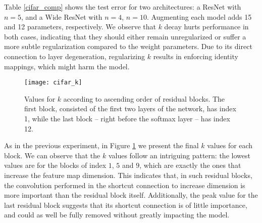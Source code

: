 \documentclass{article} \RequirePackage{amsmath,amsthm,amsfonts,amssymb}
\begin{document}
Table \ref{cifar_comp} shows the test error for two architectures: a ResNet with $n = 5$, and a Wide ResNet with $n = 4$, $n = 10$. Augmenting each model adds 15 and 12 parameters, respectively. We observe that $k$ decay hurts performance in both cases, indicating that they should either remain unregularized or suffer a more subtle regularization compared to the weight parameters. Due to its direct connection to layer degeneration, regularizing $k$ results in enforcing identity mappings, which might harm the model.




\begin{figure}[!ht]
  \centering
    \texttt{[image: cifar\_k]}
  \caption{Values for $k$ according to ascending order of residual blocks. The first block, consisted of the first two layers of the network, has index 1, while the last block -- right before the softmax layer -- has index 12.}
\label{cpruning}
\end{figure}




As in the previous experiment, in Figure \ref{cpruning} we present the final $k$ values for each block. We can observe that the $k$ values follow an intriguing pattern: the lowest values are for the blocks of index $1$, $5$ and $9$, which are exactly the ones that increase the feature map dimension. This indicates that, in such residual blocks, the convolution performed in the shortcut connection to increase dimension is more important than the residual block itself. Additionally, the peak value for the last residual block suggests that its shortcut connection is of little importance, and could as well be fully removed without greatly impacting the model.
\end{document}
